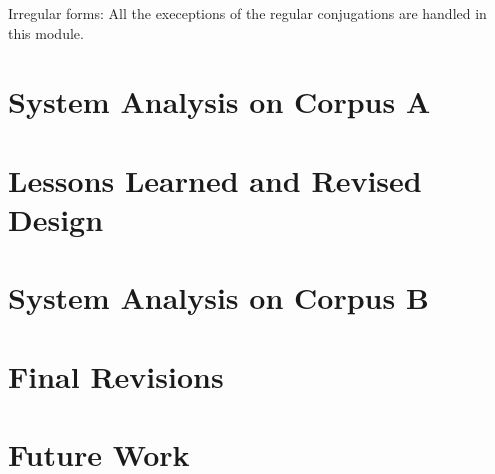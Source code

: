 \documentclass[11pt,letterpaper]{article}
\begin{document}
\indent Irregular forms: All the execeptions of the regular conjugations are handled in this module.\\





\section{System Analysis on Corpus A}

\section{Lessons Learned and Revised Design}

\section{System Analysis on Corpus B}

\section{Final Revisions}

\section{Future Work}







\label{lastpage}
\end{document}
